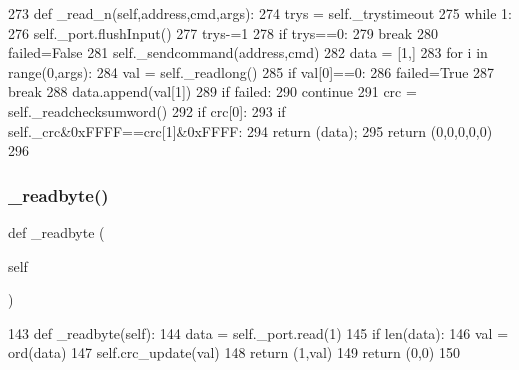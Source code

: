 \begin{DoxyCode}
273     \textcolor{keyword}{def }\_read\_n(self,address,cmd,args):
274         trys = self.\_trystimeout
275         \textcolor{keywordflow}{while} 1:
276             self.\_port.flushInput()
277             trys-=1
278             \textcolor{keywordflow}{if} trys==0:
279                 \textcolor{keywordflow}{break}
280             failed=\textcolor{keyword}{False}
281             self.\_sendcommand(address,cmd)
282             data = [1,]
283             \textcolor{keywordflow}{for} i \textcolor{keywordflow}{in} range(0,args):
284                 val = self.\_readlong()
285                 \textcolor{keywordflow}{if} val[0]==0:
286                     failed=\textcolor{keyword}{True}
287                     \textcolor{keywordflow}{break}
288                 data.append(val[1])
289             \textcolor{keywordflow}{if} failed:
290                 \textcolor{keywordflow}{continue}
291             crc = self.\_readchecksumword()
292             \textcolor{keywordflow}{if} crc[0]:
293                 \textcolor{keywordflow}{if} self.\_crc&0xFFFF==crc[1]&0xFFFF:
294                     \textcolor{keywordflow}{return} (data);
295         \textcolor{keywordflow}{return} (0,0,0,0,0)
296 
\end{DoxyCode}
\mbox{\label{classtoxic__hardware_1_1roboclaw__3_1_1Roboclaw_aa44404ef49547768501e8a0ac6cb0fcd}} 
\subsubsection{\texorpdfstring{\+\_\+readbyte()}{\_readbyte()}}
{\footnotesize\ttfamily def \+\_\+readbyte (\begin{DoxyParamCaption}\item[{}]{self }\end{DoxyParamCaption})\hspace{0.3cm}{\ttfamily [private]}}


\begin{DoxyCode}
143     \textcolor{keyword}{def }\_readbyte(self):
144         data = self.\_port.read(1)
145         \textcolor{keywordflow}{if} len(data):
146             val = ord(data)
147             self.crc\_update(val)
148             \textcolor{keywordflow}{return} (1,val)  
149         \textcolor{keywordflow}{return} (0,0)
150         
\end{DoxyCode}
\mbox{\label{classtoxic__hardware_1_1roboclaw__3_1_1Roboclaw_a28d7d81001704ec45abf4ac3067328eb}} 
